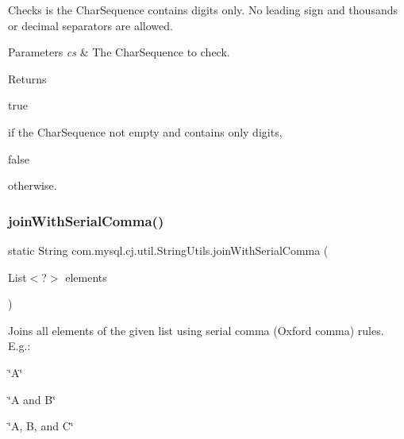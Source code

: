 Checks is the Char\+Sequence contains digits only. No leading sign and thousands or decimal separators are allowed.


\begin{DoxyParams}{Parameters}
{\em cs} & The Char\+Sequence to check. \\
\hline
\end{DoxyParams}
\begin{DoxyReturn}{Returns}

\begin{DoxyCode}
\textcolor{keyword}{true} 
\end{DoxyCode}
 if the Char\+Sequence not empty and contains only digits,
\begin{DoxyCode}
\textcolor{keyword}{false} 
\end{DoxyCode}
 otherwise. 
\end{DoxyReturn}
\mbox{\label{classcom_1_1mysql_1_1cj_1_1util_1_1_string_utils_afa316f29440d108b71338a160eeb4868}} 
\subsubsection{\texorpdfstring{join\+With\+Serial\+Comma()}{joinWithSerialComma()}}
{\footnotesize\ttfamily static String com.\+mysql.\+cj.\+util.\+String\+Utils.\+join\+With\+Serial\+Comma (\begin{DoxyParamCaption}\item[{List$<$?$>$}]{elements }\end{DoxyParamCaption})\hspace{0.3cm}{\ttfamily [static]}}

Joins all elements of the given list using serial comma (Oxford comma) rules. E.\+g.\+:
\begin{DoxyItemize}
\item \char`\"{}\+A\char`\"{}
\item \char`\"{}\+A and B\char`\"{}
\item \char`\"{}\+A, B, and C\char`\"{}
\end{DoxyItemize}


